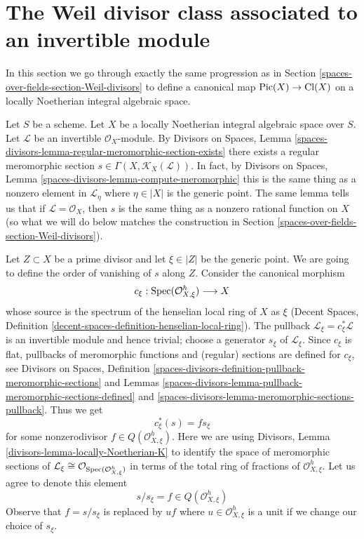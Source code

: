 \section{The Weil divisor class associated to an invertible module}
\label{spaces-over-fields-section-c1}
In this section we go through exactly the same progression as in
Section \ref{spaces-over-fields-section-Weil-divisors} to define a canonical map
$\operatorname{Pic}(X) \to \text{Cl}(X)$
on a locally Noetherian integral algebraic space.

\medskip\noindent
Let $S$ be a scheme. Let $X$ be a locally Noetherian integral algebraic space
over $S$. Let $\mathcal{L}$ be an invertible $\mathcal{O}_X$-module.
By Divisors on Spaces, Lemma
\ref{spaces-divisors-lemma-regular-meromorphic-section-exists}
there exists a regular meromorphic section
$s \in \Gamma(X, \mathcal{K}_X(\mathcal{L}))$.
In fact, by Divisors on Spaces, Lemma
\ref{spaces-divisors-lemma-compute-meromorphic}
this is the same thing as a nonzero element in
$\mathcal{L}_\eta$ where $\eta \in |X|$ is the generic point.
The same lemma tells us that if $\mathcal{L} = \mathcal{O}_X$,
then $s$ is the same thing as a nonzero rational function on $X$
(so what we will do below matches the construction in
Section \ref{spaces-over-fields-section-Weil-divisors}).

\medskip\noindent
Let $Z \subset X$ be a prime divisor and let $\xi \in |Z|$ be the generic point.
We are going to define the order of vanishing of $s$ along $Z$.
Consider the canonical morphism
$$
c_\xi : \operatorname{Spec}(\mathcal{O}_{X, \xi}^h) \longrightarrow X
$$
whose source is the spectrum of the henselian local ring of $X$ as $\xi$
(Decent Spaces, Definition \ref{decent-spaces-definition-henselian-local-ring}).
The pullback $\mathcal{L}_\xi = c_\xi^*\mathcal{L}$
is an invertible module and hence trivial; choose a generator $s_\xi$ of
$\mathcal{L}_\xi$. Since $c_\xi$ is flat, pullbacks of meromorphic functions
and (regular) sections are defined for $c_\xi$, see
Divisors on Spaces, Definition
\ref{spaces-divisors-definition-pullback-meromorphic-sections} and
Lemmas \ref{spaces-divisors-lemma-pullback-meromorphic-sections-defined} and
\ref{spaces-divisors-lemma-meromorphic-sections-pullback}.
Thus we get
$$
c_\xi^*(s) = f s_\xi
$$
for some nonzerodivisor $f \in Q(\mathcal{O}_{X, \xi}^h)$.
Here we are using Divisors, Lemma \ref{divisors-lemma-locally-Noetherian-K}
to identify the space of meromorphic sections of
$\mathcal{L}_\xi \cong \mathcal{O}_{\operatorname{Spec}(\mathcal{O}_{X, \xi}^h)}$
in terms of the total ring of fractions of $\mathcal{O}_{X, \xi}^h$.
Let us agree to denote this element
$$
s/s_\xi = f \in  Q(\mathcal{O}_{X, \xi}^h)
$$
Observe that $f = s/s_\xi$
is replaced by $uf$ where $u \in \mathcal{O}_{X, \xi}^h$
is a unit if we change our choice of $s_\xi$.

